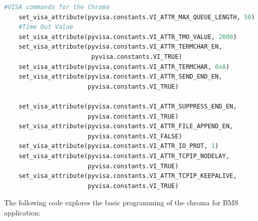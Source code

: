 % 
\begin{lstlisting}[language=Python, caption=VISA parameters set for Chroma]
    #VISA commands for the Chroma
    set_visa_attribute(pyvisa.constants.VI_ATTR_MAX_QUEUE_LENGTH, 50)
    #Time Out Value 
    set_visa_attribute(pyvisa.constants.VI_ATTR_TMO_VALUE, 2000) 
    set_visa_attribute(pyvisa.constants.VI_ATTR_TERMCHAR_EN, 
                        pyvisa.constants.VI_TRUE)
    set_visa_attribute(pyvisa.constants.VI_ATTR_TERMCHAR, 0xA) 
    set_visa_attribute(pyvisa.constants.VI_ATTR_SEND_END_EN, 
                       pyvisa.constants.VI_TRUE) 
    
    set_visa_attribute(pyvisa.constants.VI_ATTR_SUPPRESS_END_EN, 
                       pyvisa.constants.VI_TRUE)
    set_visa_attribute(pyvisa.constants.VI_ATTR_FILE_APPEND_EN, 
                       pyvisa.constants.VI_FALSE) 
    set_visa_attribute(pyvisa.constants.VI_ATTR_IO_PROT, 1) 
    set_visa_attribute(pyvisa.constants.VI_ATTR_TCPIP_NODELAY, 
                       pyvisa.constants.VI_TRUE) 
    set_visa_attribute(pyvisa.constants.VI_ATTR_TCPIP_KEEPALIVE, 
                       pyvisa.constants.VI_TRUE)
\end{lstlisting}

The following code explores the basic programming of the chroma for BMS application:


